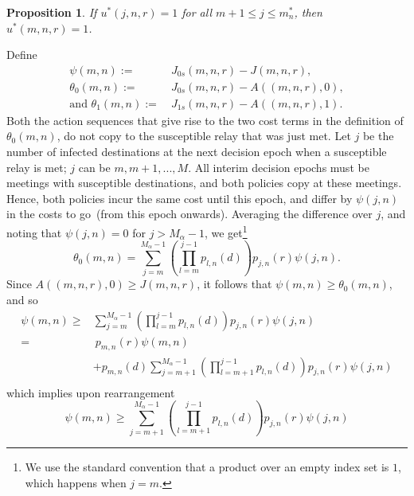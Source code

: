 \documentclass[10pt,journal,letterpaper]{IEEEtran}
\newtheorem{proposition}{Proposition}[section]
\begin{document}
\begin{proposition}
If $u^{\ast}(j,n,r) = 1$ for all $m+1 \leq j \leq m^{\ast}_n$, then $u^{\ast}(m,n,r) = 1$.
\end{proposition}
\begin{IEEEproof}
Define
\begin{align*}
\psi(m,n) := &~J_{0s}(m,n,r) - J(m,n,r),\\
\theta_0(m,n) := &~J_{0s}(m,n,r) - A((m,n,r),0), \\
\mbox {and } \theta_1(m,n) := &~J_{1s}(m,n,r) - A((m,n,r),1).
\end{align*}
Both the action sequences that give rise to the two cost terms in
the definition of $\theta_0(m,n)$, do not copy to the
susceptible relay that was just met. Let $j$ be the number of infected
destinations at the next decision epoch when a susceptible relay is
met; $j$ can be $m, m+1, ..., M$. All interim decision epochs must be
meetings with susceptible destinations, and both policies copy at
these meetings. Hence, both policies incur the same cost until this
epoch, and differ by $\psi(j,n)$ in the costs to go~(from this epoch onwards).
Averaging the difference over $j$, and noting that $\psi(j,n) = 0$ for $j >
M_{\alpha} -1$, we get\footnote{We use the
standard convention that a product over an empty index set is $1$,
which happens when $j = m$.}
\begin{equation}
\label{eqn:theta_0}
 \theta_0(m,n) = \sum_{j =m}^{M_{\alpha}-1}\left(\prod_{l =m}^{j-1}p_{l,n}(d)\right)p_{j,n}(r)\psi(j,n).
\end{equation}
Since $A((m,n,r),0) \geq J(m,n,r)$, it follows that $\psi(m,n) \geq \theta_0(m,n)$, and so
\vspace{1pt}
\begin{align*}
 \psi(m,n) \geq & \sum_{j = m}^{M_{\alpha}-1}\left(\prod_{l =
m}^{j-1}p_{l,n}(d)\right)p_{j,n}(r)\psi(j,n)  \\
= & \ p_{m,n}(r)\psi(m,n) \\
& +  p_{m,n}(d) \sum_{j = m+1}^{M_{\alpha}-1}\left(\prod_{l =
m+1}^{j-1}p_{l,n}(d)\right)p_{j,n}(r)\psi(j,n)  \\
\end{align*}
which implies upon rearrangement
\begin{equation}
\psi(m,n) \geq \sum_{j = m+1}^{M_{\alpha}-1}\left(\prod_{l =
m+1}^{j-1}p_{l,n}(d)\right)p_{j,n}(r)\psi(j,n)   \label{eqn:psi-nm}
\end{equation}


\end{IEEEproof}
\end{document}
